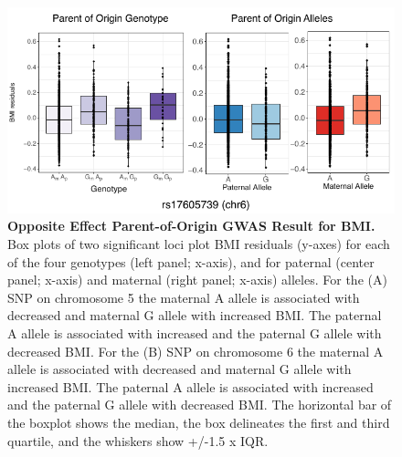 \begin{figure}[!htb]
\centering \includegraphics[width=5in]{img/ch02/fig-04-bmi_oegwas.pdf}
\caption[Opposite Effect Parent-of-Origin GWAS Result for BMI.]{\textbf{Opposite Effect Parent-of-Origin GWAS Result for BMI.}  Box plots of two significant loci plot BMI residuals (y-axes) for each of the four genotypes (left panel; x-axis), and for paternal (center panel; x-axis) and maternal (right panel; x-axis) alleles. For the (A) SNP on chromosome 5 the maternal A allele is associated with decreased and maternal G allele with increased BMI. The paternal A allele is associated with increased and the paternal G allele with decreased BMI. For the (B) SNP on chromosome 6 the maternal A allele is associated with decreased and maternal G allele with increased BMI. The paternal A allele is associated with increased and the paternal G allele with decreased BMI. The horizontal bar of the boxplot shows the median, the box delineates the first and third quartile, and the whiskers show +/-1.5 x IQR.}
\label{fig:bmi_oegwas}
\end{figure}



